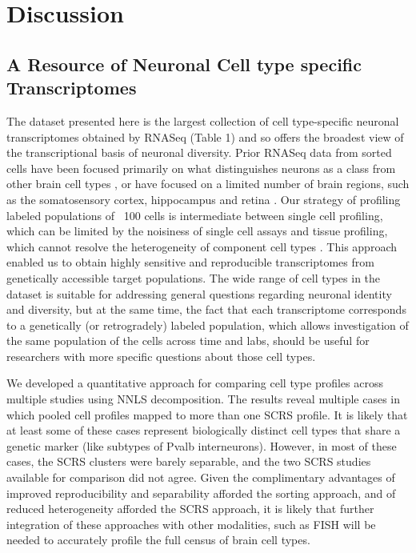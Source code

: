 
\section{Discussion}

\subsection{A Resource of Neuronal Cell type specific Transcriptomes}
The dataset presented here is the largest collection of cell type-specific neuronal transcriptomes obtained by RNASeq (Table 1) and so offers the broadest view of the transcriptional basis of neuronal diversity. Prior RNASeq data from sorted cells have been focused primarily on what distinguishes neurons as a class from other brain cell types \cite{Zhang_2014}, or have focused on a limited number of brain regions, such as the somatosensory cortex, hippocampus  \cite{Zeisel_2015} and retina \cite{Macosko_2015}. Our strategy of profiling labeled populations of ~100 cells is intermediate between single cell profiling, which can be limited by the noisiness of single cell assays \cite{Marinov_2013} and tissue profiling, which cannot resolve the heterogeneity of component cell types \cite{Nelson_2006}. This approach enabled us to obtain highly sensitive and reproducible transcriptomes from genetically accessible target populations. The wide range of cell types in the dataset is suitable for addressing general questions regarding neuronal identity and diversity, but at the same time, the fact that each transcriptome corresponds to a genetically (or retrogradely) labeled population, which allows investigation of the same population of the cells across time and labs, should be useful for researchers with more specific questions about those cell types.

We developed a quantitative approach for comparing cell type profiles across multiple studies using NNLS decomposition. The results reveal multiple cases in which pooled cell profiles mapped to more than one SCRS profile. It is likely that at least some of these cases represent biologically distinct cell types that share a genetic marker (like subtypes of Pvalb interneurons). However, in most of these cases, the SCRS clusters were barely separable, and the two SCRS studies available for comparison did not agree. Given the complimentary advantages of improved reproducibility and separability afforded the sorting approach, and of reduced heterogeneity afforded the SCRS approach, it is likely that further integration of these approaches with other modalities, such as FISH \cite{Moffitt_2016} will be needed to accurately profile the full census of brain cell types. 

